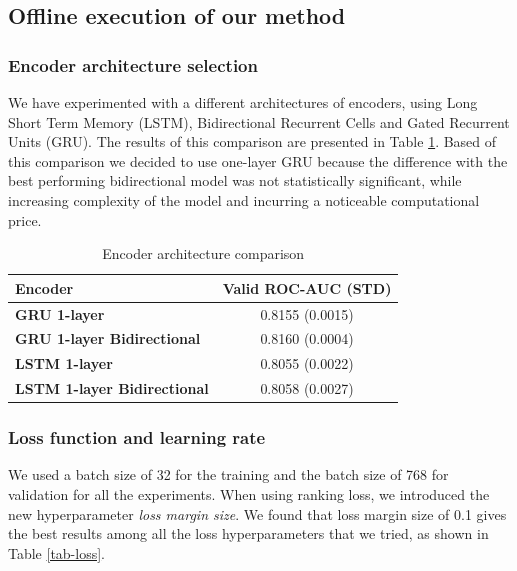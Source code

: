 \documentclass[sigconf]{acmart}
\begin{document}
\subsection{Offline execution of our method} \label{sec-exec}

\subsubsection{Encoder architecture selection} \label{sec-arc-sel}

We have experimented with a different architectures of encoders, using Long Short Term Memory (LSTM), Bidirectional Recurrent Cells \cite{schuster1997bidirectional} and Gated Recurrent Units (GRU). The results of this comparison are presented in Table \ref{tab-enc-arch}. Based of this comparison we decided to use one-layer GRU because the difference with the best performing bidirectional model was not statistically significant, while increasing complexity of the model and incurring a noticeable computational price.

\begin{table}[ht]
\caption{Encoder architecture comparison}
\begin{tabular}{ | l | c |  }
\hline
\textbf{Encoder} & \textbf{Valid ROC-AUC (STD)} \\
\hline
\textbf{GRU 1-layer} & 0.8155 (0.0015)  \\
\textbf{GRU 1-layer Bidirectional} & 0.8160 (0.0004)  \\
\textbf{LSTM 1-layer} & 0.8055 (0.0022) \\
\textbf{LSTM 1-layer Bidirectional} & 0.8058 (0.0027)  \\

\hline
\end{tabular}
\label{tab-enc-arch}
\end{table}


\subsubsection{Loss function and learning rate}

We used a batch size of 32 for the training and the batch size of 768 for validation for all the experiments. When using ranking loss, we introduced the new hyperparameter \textit{loss margin size}. We found that loss margin size of 0.1 gives the best results among all the loss hyperparameters that we tried, as shown in Table \ref{tab-loss}.
\end{document}
